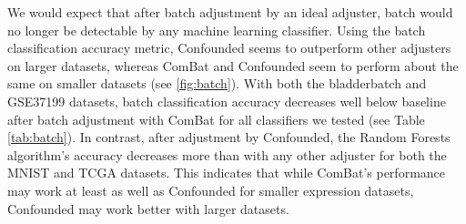 \documentclass[11pt]{article}
\begin{document}
We would expect that after batch adjustment by an ideal adjuster, batch would no longer be detectable by any machine learning classifier.
Using the batch classification accuracy metric, Confounded seems to outperform other adjusters on larger datasets, whereas ComBat and Confounded seem to perform about the same on smaller datasets (see \figurename{} \ref{fig:batch}).
With both the bladderbatch and GSE37199 datasets, batch classification accuracy decreases well below baseline after batch adjustment with ComBat for all classifiers we tested (see Table \ref{tab:batch}).
In contrast, after adjustment by Confounded, the Random Forests algorithm's accuracy decreases more than with any other adjuster for both the MNIST and TCGA datasets.
This indicates that while ComBat's performance may work at least as well as Confounded for smaller expression datasets, Confounded may work better with larger datasets.
\end{document}
